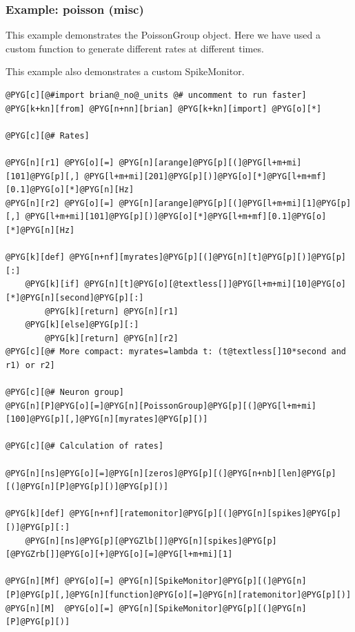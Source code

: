 \documentclass[letterpaper,10pt,english]{manual}
\begin{document}
\resetcurrentobjects
\hypertarget{--doc-examples-misc_poisson}{}

\hypertarget{index-60}{}\subsubsection{Example: poisson (misc)}

This example demonstrates the PoissonGroup object. Here we have
used a custom function to generate different rates at different
times.

This example also demonstrates a custom SpikeMonitor.

\begin{Verbatim}[commandchars=@\[\]]
@PYG[c][@#import brian@_no@_units @# uncomment to run faster]
@PYG[k+kn][from] @PYG[n+nn][brian] @PYG[k+kn][import] @PYG[o][*]

@PYG[c][@# Rates]

@PYG[n][r1] @PYG[o][=] @PYG[n][arange]@PYG[p][(]@PYG[l+m+mi][101]@PYG[p][,] @PYG[l+m+mi][201]@PYG[p][)]@PYG[o][*]@PYG[l+m+mf][0.1]@PYG[o][*]@PYG[n][Hz]
@PYG[n][r2] @PYG[o][=] @PYG[n][arange]@PYG[p][(]@PYG[l+m+mi][1]@PYG[p][,] @PYG[l+m+mi][101]@PYG[p][)]@PYG[o][*]@PYG[l+m+mf][0.1]@PYG[o][*]@PYG[n][Hz]

@PYG[k][def] @PYG[n+nf][myrates]@PYG[p][(]@PYG[n][t]@PYG[p][)]@PYG[p][:]
    @PYG[k][if] @PYG[n][t]@PYG[o][@textless[]]@PYG[l+m+mi][10]@PYG[o][*]@PYG[n][second]@PYG[p][:]
        @PYG[k][return] @PYG[n][r1]
    @PYG[k][else]@PYG[p][:]
        @PYG[k][return] @PYG[n][r2]
@PYG[c][@# More compact: myrates=lambda t: (t@textless[]10*second and r1) or r2]

@PYG[c][@# Neuron group]
@PYG[n][P]@PYG[o][=]@PYG[n][PoissonGroup]@PYG[p][(]@PYG[l+m+mi][100]@PYG[p][,]@PYG[n][myrates]@PYG[p][)]

@PYG[c][@# Calculation of rates]

@PYG[n][ns]@PYG[o][=]@PYG[n][zeros]@PYG[p][(]@PYG[n+nb][len]@PYG[p][(]@PYG[n][P]@PYG[p][)]@PYG[p][)]

@PYG[k][def] @PYG[n+nf][ratemonitor]@PYG[p][(]@PYG[n][spikes]@PYG[p][)]@PYG[p][:]
    @PYG[n][ns]@PYG[p][@PYGZlb[]]@PYG[n][spikes]@PYG[p][@PYGZrb[]]@PYG[o][+]@PYG[o][=]@PYG[l+m+mi][1]

@PYG[n][Mf] @PYG[o][=] @PYG[n][SpikeMonitor]@PYG[p][(]@PYG[n][P]@PYG[p][,]@PYG[n][function]@PYG[o][=]@PYG[n][ratemonitor]@PYG[p][)]
@PYG[n][M]  @PYG[o][=] @PYG[n][SpikeMonitor]@PYG[p][(]@PYG[n][P]@PYG[p][)]


\end{Verbatim}
\end{document}

